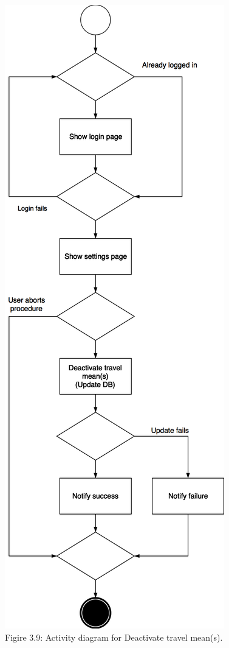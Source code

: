 \documentclass{article}
\begin{document}
	\begin{center}
		\includegraphics[scale=0.25]{img/diagrams/deactivate_travel_mean_ad.png} \\ \bigskip
		Figire 3.9: Activity diagram for Deactivate travel mean(s).
	\end{center}
	\newpage
	
\end{document}
